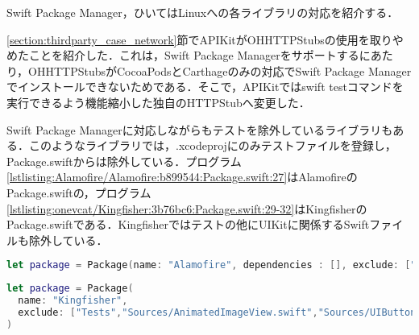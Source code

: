 Swift Package Manager，ひいてはLinuxへの各ライブラリの対応を紹介する．

\ref{section:thirdparty_case_network}節でAPIKitがOHHTTPStubsの使用を取りやめたことを紹介した．これは，Swift Package Managerをサポートするにあたり，OHHTTPStubsがCocoaPodsとCarthageのみの対応でSwift Package Managerでインストールできないためである．そこで，APIKitではswift testコマンドを実行できるよう機能縮小した独自の{\sf HTTPStub}へ変更した\cite{github:ishkawa/APIKit:130}\cite{github:ishkawa/APIKit:209}．

Swift Package Managerに対応しながらもテストを除外しているライブラリもある．このようなライブラリでは，.xcodeprojにのみテストファイルを登録し，Package.swiftからは除外している．プログラム\ref{lstlisting:Alamofire/Alamofire:b899544:Package.swift:27}はAlamofireのPackage.swiftの，プログラム\ref{lstlisting:onevcat/Kingfisher:3b76bc6:Package.swift:29-32}はKingfisherのPackage.swiftである．Kingfisherではテストの他にUIKitに関係するSwiftファイルも除外している．

\begin{lstlisting}[language=swift,caption=\href{https://github.com/Alamofire/Alamofire/blob/b8995447518fd57af14c88a47f27434a16f60403/Package.swift}{Alamofireのパッケージ設定},label=lstlisting:Alamofire/Alamofire:b899544:Package.swift:27,firstnumber=27]
let package = Package(name: "Alamofire", dependencies : [], exclude: ["Tests"])
\end{lstlisting}

\begin{lstlisting}[language=swift,caption=\href{https://github.com/onevcat/Kingfisher/blob/3b76bc6ca9f56d5fd5635439eda9318eff7945e3/Package.swift}{Kingfisherのパッケージ設定},label=lstlisting:onevcat/Kingfisher:3b76bc6:Package.swift:29-32,firstnumber=29]
let package = Package(
  name: "Kingfisher",
  exclude: ["Tests","Sources/AnimatedImageView.swift","Sources/UIButton+Kingfisher.swift"]
)
\end{lstlisting}

